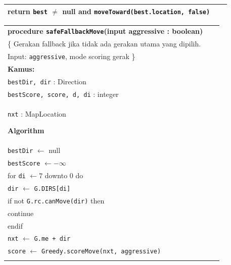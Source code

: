 \documentclass{article}
\newenvironment{pseudobox}
{
\centering
\begin{longtable}{|p{0.94\linewidth}|}
\hline
}
{
\\ \hline
\end{longtable}
\vspace{0.05cm}
}
\begin{document}
\begin{enumerate}[label=\alph*.]
\begin{enumerate}[label=\alph*.]
\begin{pseudobox}
\hspace*{1.5em}return \texttt{best} $\neq$ null and \texttt{moveToward(best.location, false)}
\end{pseudobox}

\begin{pseudobox}
\textbf{procedure \texttt{safeFallbackMove}(input aggressive : boolean)} \\
\{ Gerakan fallback jika tidak ada gerakan utama yang dipilih. \\
Input: \texttt{aggressive}, mode scoring gerak
\} \\

\textbf{Kamus:} \\
\hspace*{1.5em}\texttt{bestDir, dir} : Direction \\
\hspace*{1.5em}\texttt{bestScore, score, d, di} : integer \\
\hspace*{1.5em}\texttt{nxt} : MapLocation

\textbf{Algorithm} \\
\hspace*{1.5em}\texttt{bestDir} $\leftarrow$ null \\
\hspace*{1.5em}\texttt{bestScore} $\leftarrow -\infty$ \\

\hspace*{1.5em}for \texttt{di} $\leftarrow 7$ downto 0 do \\
\hspace*{3em}\texttt{dir} $\leftarrow$ \texttt{G.DIRS[di]} \\
\hspace*{3em}if not \texttt{G.rc.canMove(dir)} then \\
\hspace*{4.5em}continue \\
\hspace*{3em}endif \\

\hspace*{3em}\texttt{nxt} $\leftarrow$ \texttt{G.me + dir} \\
\hspace*{3em}\texttt{score} $\leftarrow$ \texttt{Greedy.scoreMove(nxt, aggressive)} \\


\end{pseudobox}
\end{enumerate}
\end{enumerate}
\end{document}
